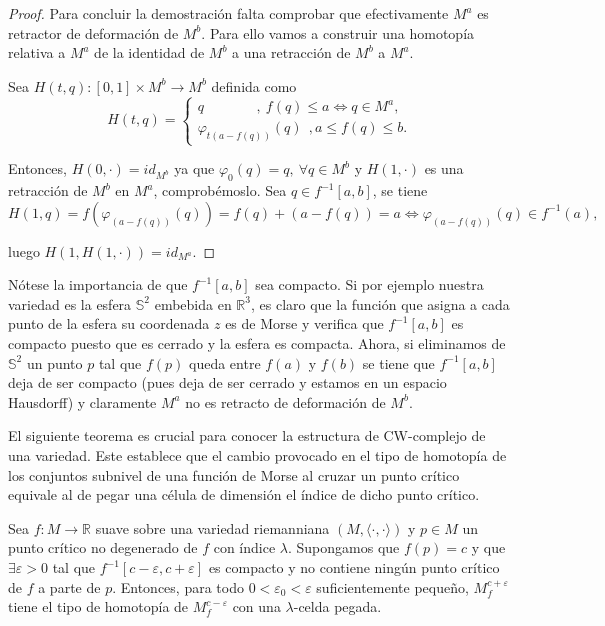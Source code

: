 \begin{proof}
     Para concluir la demostración falta comprobar que efectivamente $M^a$ es retractor de deformación de $M^b$. Para ello vamos a construir una homotopía relativa a $M^a$ de la identidad de $M^b$ a una retracción de $M^b$ a $M^a$.
     
    Sea $H(t,q):[0,1]\times M^b\to M^b$ definida como
    \begin{equation*}
        H(t,q)=
        \begin{cases}
            q~~~~~~~~~~~~~~~~~,~f(q)\le a\iff q\in M^a,\\
            \varphi_{t(a-f(q))}(q)~~,a\le f(q)\le b.
        \end{cases}
    \end{equation*}

    Entonces, $H(0,\cdot) = id_{M^b}$ ya que $\varphi_0(q)=q,~\forall q\in M^b$ y $H(1,\cdot)$ es una retracción de $M^b$ en $M^a$, comprobémoslo. Sea $q\in f^{-1}[a,b]$, se tiene
    \begin{equation*}
        H(1,q)=f(\varphi_{(a-f(q))}(q))= f(q)+(a-f(q))= a \iff \varphi_{(a-f(q))}(q)\in f^{-1}(a),
    \end{equation*}

    luego $H(1,H(1,\cdot))= id_{M^a}$.    

\end{proof}
\begin{remark}
    Nótese la importancia de que $f^{-1}[a,b]$ sea compacto. Si por ejemplo nuestra variedad es la esfera $\mathbb{S}^2$ embebida en $\mathbb{R}^3$, es claro que la función que asigna a cada punto de la esfera su coordenada $z$ es de Morse y verifica que $f^{-1}[a,b]$ es compacto puesto que es cerrado y la esfera es compacta. Ahora, si eliminamos de $\mathbb{S}^2$ un punto $p$ tal que $f(p)$ queda entre $f(a)$ y $f(b)$ se tiene que $f^{-1}[a,b]$ deja de ser compacto (pues deja de ser cerrado y estamos en un espacio Hausdorff) y claramente $M^a$ no es retracto de deformación de $M^b$. 
\end{remark}
\bigskip

El siguiente teorema es crucial para conocer la estructura de CW-complejo de una variedad. Este establece que el cambio provocado en el tipo de homotopía de los conjuntos subnivel de una función de Morse al cruzar un punto crítico equivale al de pegar una célula de dimensión el índice de dicho punto crítico.

\begin{theorem}
\label{pegadocelula}
     Sea $f:M\to\mathbb{R}$ suave sobre una variedad riemanniana $(M,\langle\cdot,\cdot\rangle)$ y $p\in M$ un punto crítico no degenerado de $f$ con índice $\lambda$. Supongamos que $f(p)=c$ y que  $\exists\varepsilon>0$ tal que $f^{-1}[c-\varepsilon,c+\varepsilon]$ es compacto y no contiene ningún punto crítico de $f$ a parte de $p$. Entonces, para todo $0<\varepsilon_0<\varepsilon$ suficientemente pequeño, $M^{c+\varepsilon}_f$ tiene el tipo de homotopía de $M^{c-\varepsilon}_f$ con una $\lambda$-celda pegada.
\end{theorem}

